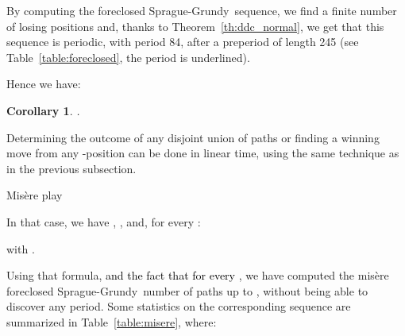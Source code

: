 \documentclass[11pt]{article}
\newcommand{\modif}[1]{\textcolor{black}{#1}}
\newcommand{\efface}[1]{}
\newcommand{\centre}[1]{\begin{center}#1\end{center}}
\newcommand{\SP}{Sprague-Grundy}
\newtheorem{corollary}[theorem]{Corollary}
\begin{document}
By computing the foreclosed \SP\ sequence, we find a finite number of losing positions and,
thanks to Theorem~\ref{th:ddc_normal}, we get that this sequence is periodic, with period 84, after
a preperiod of length 245 (see Table~\ref{table:foreclosed}, the period is underlined).

\begin{table}

\caption{\label{table:foreclosed}
The foreclosed \SP\ sequence under normal play}
\end{table}

Hence we have:

\begin{corollary}
.
\end{corollary}

Determining the outcome of any disjoint union of paths or finding
a winning move from any -position can be done in linear time,
using the same technique as in the previous subsection.

\vskip 4mm

\centre{{\sc Mis\`ere play}}

In that case, we have ,
,
 and, for every :

with .

Using that formula, \modif{and the fact that
 for every },
we have computed the mis\`ere foreclosed
\SP\ number of paths up to , without being able to
discover any period. Some statistics on the corresponding
sequence are summarized in Table~\ref{table:misere}, where:
\efface{
\begin{itemize}
\item  is the upper bound of the considered interval ,
\item  is the number of paths in  with foreclosed \SP\ number 0,
\item  is the maximal foreclosed \SP\ number on ,
\item  is the mean of the foreclosed \SP\ numbers on ,
\item  is the standard deviation of the foreclosed \SP\ numbers on ,
\item  is the most frequently encountered foreclosed \SP\ number on ,
\item  is the percentage of apparition of FreqV on ,
\item  is the largest index of a path in  with foreclosed \SP\ number 0,
\item  is the index of the largest foreclosed \SP\ number on .\\
\end{itemize}
}
\end{document}
